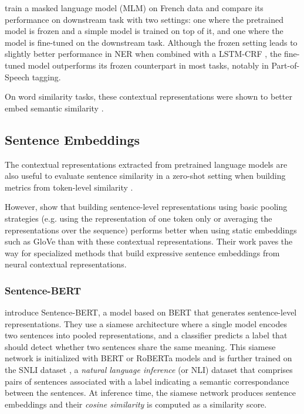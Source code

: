 \citet{martin-etal-2020-camembert} train a masked language model (MLM) on French data and compare its performance on downstream task with two settings: one where the pretrained model is frozen and a simple model is trained on top of it, and one where the model is fine-tuned on the downstream task. Although the frozen setting leads to slightly better performance in NER when combined with a LSTM-CRF \citep{panchendrarajan-amaresan-2018-bidirectional}, the fine-tuned model outperforms its frozen counterpart in most tasks, notably in Part-of-Speech tagging.

On word similarity tasks, these contextual representations were shown to better embed semantic similarity \citep{bommasani-etal-2020-interpreting}.



\subsection{Sentence Embeddings}
The contextual representations extracted from pretrained language models are also useful to evaluate sentence similarity in a zero-shot setting when building metrics from token-level similarity \citep{Zhang2020BERTScore}. 

However, \citet{reimers-gurevych-2019-sentence} show that building sentence-level representations using basic pooling strategies (e.g. using the representation of one token only or averaging the representations over the sequence) performs better when using static embeddings such as GloVe than with these contextual representations. Their work paves the way for specialized methods that build expressive sentence embeddings from neural contextual representations.

\subsubsection{Sentence-BERT}

\citet{reimers-gurevych-2019-sentence} introduce Sentence-BERT, a model based on BERT that generates sentence-level representations. They use a siamese architecture where a single model encodes two sentences into pooled representations, and a classifier predicts a label that should detect whether two sentences share the same meaning. This siamese network is initialized with BERT or RoBERTa models and is further trained on the SNLI dataset \citep{hill-etal-2016-learning}, a \textit{natural language inference} (or NLI) dataset that comprises pairs of sentences associated with a label indicating a semantic correspondance between the sentences. At inference time, the siamese network produces sentence embeddings and their \textit{cosine similarity} is computed as a similarity score.

